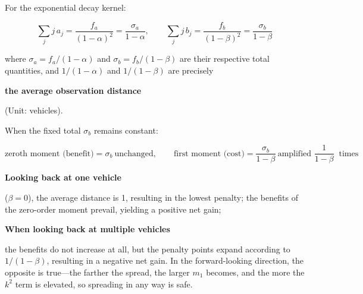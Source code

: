 \documentclass[11pt,a4paper,openany]{book}
\numberwithin{equation}{chapter}
\numberwithin{figure}{chapter}
\numberwithin{table}{chapter}
\begin{document}
For the exponential decay kernel:

\begin{equation}
\sum_j j\,a_j = \frac{f_a}{\left(1-\alpha\right)^2} = \frac{\sigma_a}{1-\alpha},
\qquad
\sum_j j\,b_j = \frac{f_b}{\left(1-\beta\right)^2} = \frac{\sigma_b}{1-\beta}
\end{equation}

where $\sigma_a=f_a/(1-\alpha)$ and $\sigma_b=f_b/(1-\beta)$ are their respective total quantities, and $1/(1-\alpha)$ and $1/(1-\beta)$ are precisely




\textbf{the average observation distance}




(Unit: vehicles).










\begin{tcolorbox}[notebox,title=\textbf{This answers the question, “Why does looking back at a single vehicle work, but not at multiple vehicles?”}]

When the fixed total $\sigma_b$ remains constant:

\[
\text{zeroth moment (benefit)} = \sigma_b \ \text{unchanged},
\qquad
\text{first moment (cost)} = \frac{\sigma_b}{1-\beta}\ \text{amplified } \frac{1}{1-\beta}\ \text{ times}
\]







\textbf{Looking back at one vehicle}




($\beta=0$), the average distance is 1, resulting in the lowest penalty; the benefits of the zero-order moment prevail, yielding a positive net gain;




\textbf{When looking back at multiple vehicles}




the benefits do not increase at all, but the penalty points expand according to $1/(1-\beta)$, resulting in a negative net gain. In the forward-looking direction, the opposite is true—the farther the spread, the larger $m_1$ becomes, and the more the $k^2$ term is elevated, so spreading in any way is safe.







\end{tcolorbox}
\end{document}
